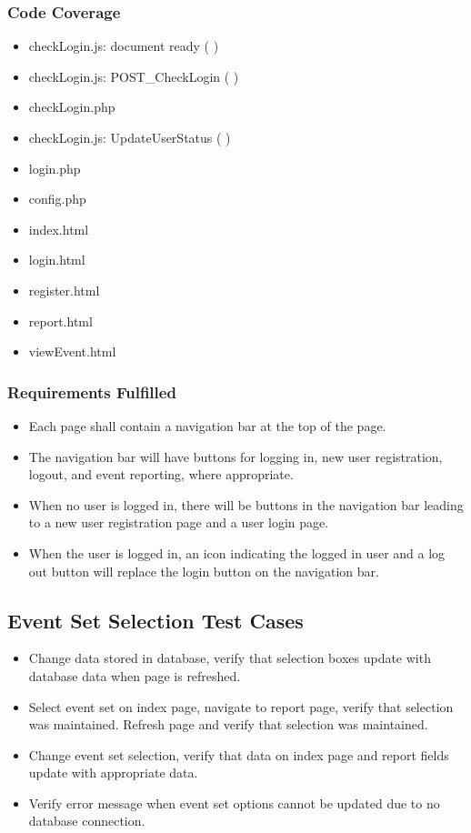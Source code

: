 \subsubsection{Code Coverage}
\begin{itemize}
\item checkLogin.js: document ready ( )
\item checkLogin.js: POST\_CheckLogin ( )
\item checkLogin.php
\item checkLogin.js: UpdateUserStatus ( )
\item login.php
\item config.php
\item index.html
\item login.html
\item register.html
\item report.html
\item viewEvent.html
\end{itemize}
\subsubsection{Requirements Fulfilled}
\begin{itemize}
\item Each page shall contain a navigation bar at the top of the page.
\item The navigation bar will have buttons for logging in, new user registration, logout, and event reporting, where appropriate.
\item When no user is logged in, there will be buttons in the navigation bar leading to a new user registration page and a user login page.
\item When the user is logged in, an icon indicating the logged in user and a log out button will replace the login button on the navigation bar.
\end{itemize}

\subsection{Event Set Selection Test Cases }
\begin{itemize}
\item Change data stored in database, verify that selection boxes update with database data when page is refreshed. 
\item Select event set on index page, navigate to report page, verify that selection was maintained. Refresh page and verify that selection was maintained. 
\item Change event set selection, verify that data on index page and report fields update with appropriate data.
\item Verify error message when event set options cannot be updated due to no database connection. 
\end{itemize}
